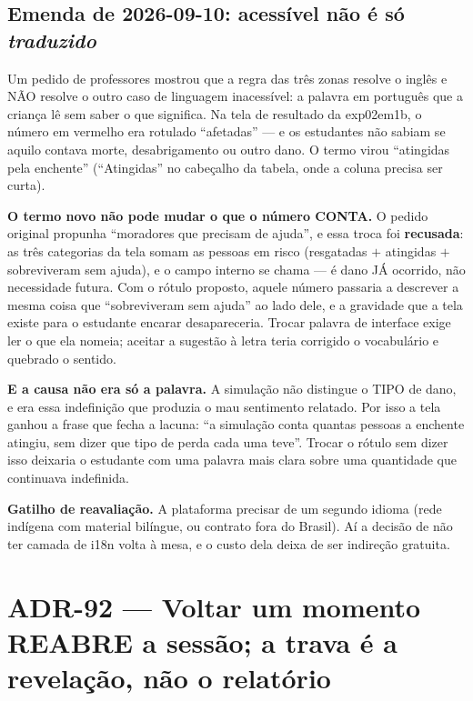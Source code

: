 \subsection{Emenda de 2026-09-10: acessível não é só \emph{traduzido}}

Um pedido de professores mostrou que a regra das três zonas resolve o inglês e
NÃO resolve o outro caso de linguagem inacessível: a palavra em português que a
criança lê sem saber o que significa. Na tela de resultado da exp02em1b, o número
em vermelho era rotulado \enquote{afetadas} --- e os estudantes não sabiam se
aquilo contava morte, desabrigamento ou outro dano. O termo virou
\enquote{atingidas pela enchente} (\enquote{Atingidas} no cabeçalho da tabela,
onde a coluna precisa ser curta).

\begin{regra}
\textbf{O termo novo não pode mudar o que o número CONTA.} O pedido original
propunha \enquote{moradores que precisam de ajuda}, e essa troca foi
\textbf{recusada}: as três categorias da tela somam as pessoas em risco
(resgatadas $+$ atingidas $+$ sobreviveram sem ajuda), e o campo interno se
chama  --- é dano JÁ ocorrido, não necessidade futura. Com o rótulo
proposto, aquele número passaria a descrever a mesma coisa que
\enquote{sobreviveram sem ajuda} ao lado dele, e a gravidade que a tela existe
para o estudante encarar desapareceria. Trocar palavra de interface exige ler o
que ela nomeia; aceitar a sugestão à letra teria corrigido o vocabulário e
quebrado o sentido.
\end{regra}

\textbf{E a causa não era só a palavra.} A simulação não distingue o TIPO de
dano, e era essa indefinição que produzia o mau sentimento relatado. Por isso a
tela ganhou a frase que fecha a lacuna: \enquote{a simulação conta quantas
pessoas a enchente atingiu, sem dizer que tipo de perda cada uma teve}. Trocar
o rótulo sem dizer isso deixaria o estudante com uma palavra mais clara sobre
uma quantidade que continuava indefinida.

\textbf{Gatilho de reavaliação.} A plataforma precisar de um segundo idioma
(rede indígena com material bilíngue, ou contrato fora do Brasil). Aí a decisão
de não ter camada de i18n volta à mesa, e o custo dela deixa de ser indireção
gratuita.

\section{ADR-92 --- Voltar um momento REABRE a sessão; a trava é a revelação, não o relatório}


